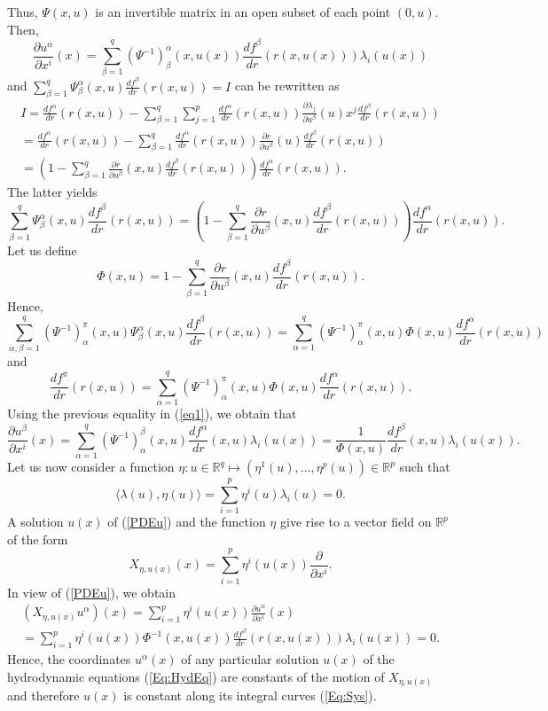 \documentclass{birkjour}
\theoremstyle{definition}
\theoremstyle{remark}
\numberwithin{equation}{section}
\numberwithin{equation}{section}
\numberwithin{thm}{section}
\numberwithin{equation}{section}
\numberwithin{thm}{section}
\begin{document}
Thus, $\Psi(x,u)$ is an invertible matrix in an open subset of each point $(0,u)$. Then,
\begin{equation}\label{eq1}
	\frac{\partial u^\alpha}{\partial x^i}(x)=\sum_{\beta=1}^q(\Psi^{-1})^\alpha_\beta(x,u(x)) \frac{df^\beta}{dr}(r(x,u(x)))\lambda_i(u(x))
\end{equation}
and $\sum_{\beta=1}^q\Psi^\alpha_\beta(x,u)\frac{df^\beta}{dr}(r(x,u))=I$ can be rewritten as 
\begin{multline*}
	I=\frac{df^\alpha}{d r}(r(x,u))-\sum_{\beta=1}^q\sum_{j=1}^p\frac{df^\alpha}{dr}(r(x,u))\frac{\partial\lambda_j}{\partial u^\beta}(u)x^j\frac{df^\beta}{d r}(r(x,u))\\=\frac{df^\alpha}{dr}(r(x,u))-\sum_{\beta=1}^q\frac{df^\alpha}{dr}(r(x,u))\frac{\partial r}{\partial u^\beta}(u)\frac{df^\beta}{dr}(r(x,u))\\=\left(1-\sum_{\beta=1}^q\frac{\partial r}{\partial u^\beta}(x,u)\frac{df^\beta}{dr}(r(x,u))\right)\frac{df^\alpha}{dr}(r(x,u)).
\end{multline*}
The latter yields
$$
\sum_{\beta=1}^q\Psi^\alpha_\beta(x,u)\frac{df^\beta}{dr}(r(x,u))=\left(1-\sum_{\beta=1}^q\frac{\partial r}{\partial u^\beta}(x,u)\frac{df^\beta}{dr}(r(x,u))\right)\frac{df^\alpha}{dr}(r(x,u)).
$$
Let us define 
$$\Phi(x,u)=1-\sum_{\beta=1}^q\frac{\partial r}{\partial u^\beta}(x,u)\frac{df^\beta}{dr}(r(x,u)).
$$
Hence,
$$
\sum_{\alpha,\beta=1}^q(\Psi^{-1})^\pi_\alpha(x,u)\Psi^\alpha_\beta(x,u)\frac{df^\beta}{dr}(r(x,u))=\sum_{\alpha=1}^q(\Psi^{-1})^\pi_\alpha(x,u)\Phi(x,u)\frac{df^\alpha}{dr}(r(x,u))$$
and 
$$
\frac{df^\pi}{dr}(r(x,u))=\sum_{\alpha=1}^q(\Psi^{-1})^\pi_\alpha(x,u)\Phi(x,u)\frac{df^\alpha}{dr}(r(x,u)).
$$
Using the previous equality in (\ref{eq1}), we obtain that
\begin{equation}\label{PDEu}
	\frac{\partial u^\beta}{\partial x^i}(x)=\sum_{\alpha=1}^q(\Psi^{-1})^\beta_\alpha(x,u)\frac{df^\alpha}{dr}(x,u)\lambda_i(u(x))=\frac{1}{\Phi(x,u)}\frac{df^\beta}{dr}(x,u)\lambda_i(u(x)).
\end{equation}
Let us now consider a function $\eta:u\in \mathbb{R}^q\mapsto (\eta^1(u),\ldots,\eta^p(u))\in \mathbb{R}^p$ such that $$\langle \lambda(u),\eta(u)\rangle=\sum_{i=1}^p\eta^i(u)\lambda_i(u)=0.
$$
A solution $u(x)$ of (\ref{PDEu}) and the function $\eta$ give rise to a vector field on $\mathbb{R}^{p}$ of the form
$$
X_{\eta,u(x)}(x)=\sum_{i=1}^p\eta^i(u(x))\frac{\partial}{\partial x^i}.
$$
In view of (\ref{PDEu}), we obtain
\begin{multline*}
	(X_{\eta,u(x)} u^\alpha)(x)=\sum_{i=1}^p\eta^i(u(x))\frac{\partial u^\alpha}{\partial x^i}(x)\\=\sum_{i=1}^p\eta^i(u(x))\Phi^{-1}(x,u(x))\frac{df^\beta}{dr}(r(x,u(x)))\lambda_i(u(x))=0. 
\end{multline*}
Hence, the coordinates $u^\alpha(x)$ of any particular solution $u(x)$  of the  hydrodynamic equations (\ref{Eq:HydEq}) are constants of the motion of $X_{\eta,u(x)}$ and therefore $u(x)$ is constant along its integral curves  (\ref{Eq:Sys}). 
\end{document}
